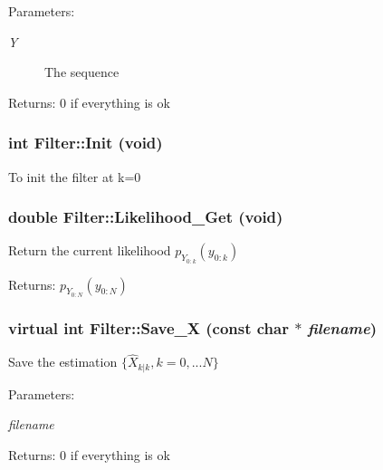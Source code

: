 \begin{Desc}
\item[Parameters:]
\begin{description}
\item[{\em Y}]The sequence\end{description}
\end{Desc}
\begin{Desc}
\item[Returns:]0 if everything is ok \end{Desc}
\hypertarget{class_filter_fbfb19e91e31f29cdcef04b9fa48c466}{
\subsubsection[{Init}]{\setlength{\rightskip}{0pt plus 5cm}int Filter::Init (void)}}
\label{class_filter_fbfb19e91e31f29cdcef04b9fa48c466}


To init the filter at k=0 \hypertarget{class_filter_0dd24e89e97c71dd06766483734c1f2a}{
\subsubsection[{Likelihood\_\-Get}]{\setlength{\rightskip}{0pt plus 5cm}double Filter::Likelihood\_\-Get (void)}}
\label{class_filter_0dd24e89e97c71dd06766483734c1f2a}


Return the current likelihood $ p_{Y_{0:k}}(y_{0:k}) $

\begin{Desc}
\item[Returns:]$ p_{Y_{0:N}}(y_{0:N}) $ \end{Desc}
\hypertarget{class_filter_0b7aad4b130b176f423b7f1c0c30a887}{
\subsubsection[{Save\_\-X}]{\setlength{\rightskip}{0pt plus 5cm}virtual int Filter::Save\_\-X (const char $\ast$ {\em filename})}}
\label{class_filter_0b7aad4b130b176f423b7f1c0c30a887}


Save the estimation $ \{ \hat{X}_{k|k} ,k=0,...N \} $

\begin{Desc}
\item[Parameters:]
\begin{description}
\item[{\em filename}]\end{description}
\end{Desc}
\begin{Desc}
\item[Returns:]0 if everything is ok \end{Desc}


